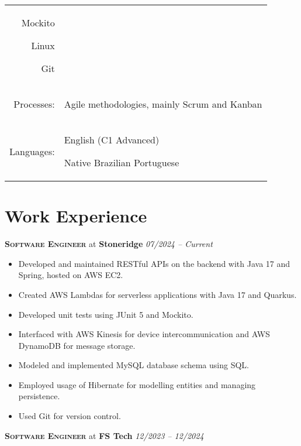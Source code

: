 \documentclass[a4paper,12pt]{article}
\begin{document}
\begin{tabular}{rp{15.2cm}}
\begin{itemize*}[label=\Large\textbullet]
    \item Mockito
    \item Linux
    \item Git
\end{itemize*}\\
\raggedleft Processes:
& \begin{itemize*}[label=\Large\textbullet]
    \item Agile methodologies, mainly Scrum and Kanban
\end{itemize*}\\
\raggedleft Languages:
& \begin{itemize*}[label=\Large\textbullet]
    \item English (C1 Advanced)
    \item Native Brazilian Portuguese
\end{itemize*}\\
\end{tabular}

\section{Work Experience}

\vspace{8pt}

{\large\textbf{\textsc{Software Engineer}}} at \textbf{Stoneridge} \hfill \textit{07/2024 -- Current}

{\small
\begin{itemize}[leftmargin=*]
    \setlength\itemsep{-0.2em}
    \item Developed and maintained RESTful APIs on the backend with Java 17 and Spring, hosted on AWS EC2.
    \item Created AWS Lambdas for serverless applications with Java 17 and Quarkus.
    \item Developed unit tests using JUnit 5 and Mockito.
    \item Interfaced with AWS Kinesis for device intercommunication and AWS DynamoDB for message storage.
    \item Modeled and implemented MySQL database schema using SQL.
    \item Employed usage of Hibernate for modelling entities and managing persistence.
    \item Used Git for version control.
\end{itemize}
}

{\large\textbf{\textsc{Software Engineer}}} at \textbf{FS Tech} \hfill \textit{12/2023 -- 12/2024}
\end{document}
